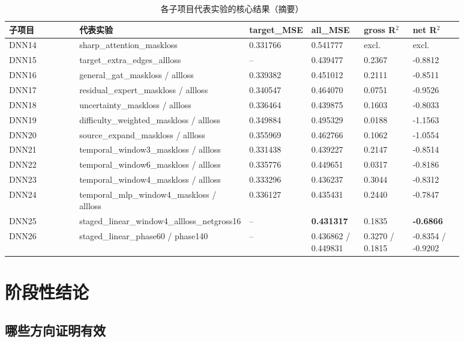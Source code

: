 \documentclass[UTF8]{ctexart}
\begin{document}
\begin{table}[htbp]
\centering
\caption{各子项目代表实验的核心结果（摘要）}
\begin{tabular}{p{0.18\linewidth}p{0.22\linewidth}p{0.12\linewidth}p{0.12\linewidth}p{0.12\linewidth}p{0.12\linewidth}}
\toprule
子项目 & 代表实验 & target\_MSE & all\_MSE & gross R\(^2\) & net R\(^2\) \\
\midrule
DNN14 & sharp\_attention\_maskloss & 0.331766 & 0.541777 & excl. & excl. \\
DNN15 & target\_extra\_edges\_allloss & -- & 0.439477 & 0.2367 & -0.8812 \\
DNN16 & general\_gat\_maskloss / allloss & 0.339382 & 0.451012 & 0.2111 & -0.8511 \\
DNN17 & residual\_expert\_maskloss / allloss & 0.340547 & 0.464070 & 0.0751 & -0.9526 \\
DNN18 & uncertainty\_maskloss / allloss & 0.336464 & 0.439875 & 0.1603 & -0.8033 \\
DNN19 & difficulty\_weighted\_maskloss / allloss & 0.349884 & 0.495329 & 0.0188 & -1.1563 \\
DNN20 & source\_expand\_maskloss / allloss & 0.355969 & 0.462766 & 0.1062 & -1.0554 \\
DNN21 & temporal\_window3\_maskloss / allloss & 0.331438 & 0.439227 & 0.2147 & -0.8514 \\
DNN22 & temporal\_window6\_maskloss / allloss & 0.335776 & 0.449651 & 0.0317 & -0.8186 \\
DNN23 & temporal\_window4\_maskloss / allloss & 0.333296 & 0.436237 & 0.3044 & -0.8312 \\
DNN24 & temporal\_mlp\_window4\_maskloss / allloss & 0.336127 & 0.435431 & 0.2440 & -0.7847 \\
DNN25 & staged\_linear\_window4\_allloss\_netgross16 & -- & \textbf{0.431317} & 0.1835 & \textbf{-0.6866} \\
DNN26 & staged\_linear\_phase60 / phase140 & -- & 0.436862 / 0.449831 & 0.3270 / 0.1815 & -0.8354 / -0.9202 \\
\bottomrule
\end{tabular}
\end{table}

\section{阶段性结论}

\subsection{哪些方向证明有效}
\end{document}
